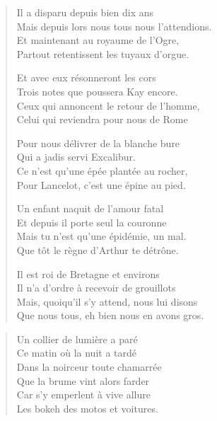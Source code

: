 \begin{verse}
Il a disparu depuis bien dix ans\\
Mais depuis lors nous tous nous l’attendions.\\
Et maintenant au royaume de l’Ogre,\\
Partout retentissent les tuyaux d’orgue.

Et avec eux résonneront les cors\\
Trois notes que poussera Kay encore.\\
Ceux qui annoncent le retour de l’homme,\\
Celui qui reviendra pour nous de Rome

Pour nous délivrer de la blanche bure\\
Qui a jadis servi Excalibur.\\
Ce n’est qu’une épée plantée au rocher,\\
Pour Lancelot, c’est une épine au pied.

Un enfant naquit de l’amour fatal\\
Et depuis il porte seul la couronne\\
Mais tu n’est qu’une épidémie, un mal.\\
Que tôt le règne d’Arthur te détrône.

Il est roi de Bretagne et environs\\
Il n’a d’ordre à recevoir de grouillots\\
Mais, quoiqu’il s’y attend, nous lui disons\\
Que nous tous, eh bien nous en avons gros.
\end{verse}

\begin{verse}
Un collier de lumière a paré\\
Ce matin où la nuit a tardé\\
Dans la noirceur toute chamarrée\\
Que la brume vint alors farder\\
Car s’y emperlent à vive allure\\
Les bokeh des motos et voitures.
\end{verse}

